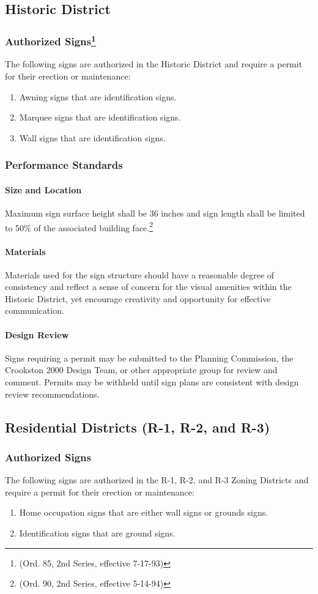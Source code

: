 \subsection{Historic District}
\subsubsection{Authorized Signs\footnote{(Ord. 85, 2nd Series, effective 7-17-93)}}
The following signs are authorized in the Historic District and require a permit for their erection or maintenance:
\begin{enumerate}[{\indent}a)]
    \item Awning signs that are identification signs.
    \item Marquee signs that are identification signs.
    \item Wall signs that are identification signs.
\end{enumerate}
\subsubsection{Performance Standards}
\paragraph{Size and Location}
Maximum sign surface height shall be 36 inches and sign length shall be limited to 50\% of the associated building face.\footnote{(Ord. 90, 2nd Series, effective 5-14-94)}
\paragraph{Materials}
Materials used for the sign structure should have a reasonable degree of consistency and reflect a sense of concern for the visual amenities within the Historic District, yet encourage creativity and opportunity for effective communication.
\paragraph{Design Review}
Signs requiring a permit may be submitted to the Planning Commission, the Crookston 2000 Design Team, or other appropriate group for review and comment.  Permits may be withheld until sign plans are consistent with design review recommendations.
\subsection{Residential Districts (R-1, R-2, and R-3)}
\subsubsection{Authorized Signs}
The following signs are authorized in the R-1, R-2, and R-3 Zoning Districts and require a permit for their erection or maintenance:
\begin{enumerate}[{\indent}a)]
    \item Home occupation signs that are either wall signs or grounds signs.
    \item Identification signs that are ground signs.
\end{enumerate}
